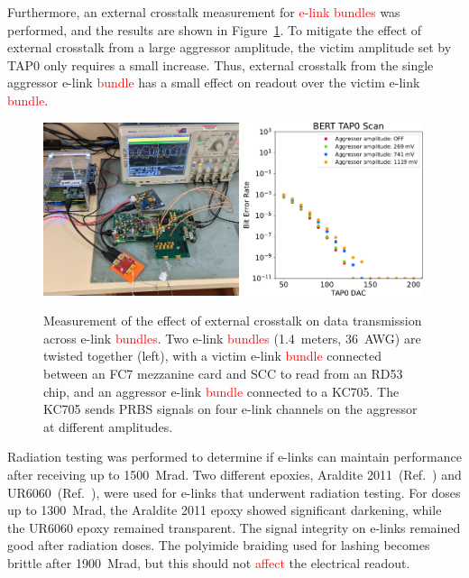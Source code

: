\documentclass[a4paper,11pt]{article}
\newcommand{\mrad}{Mrad}
\newcommand{\fig}{Figure}
\newcommand{\red}{\textcolor{red}}
\begin{document}

Furthermore, an external crosstalk measurement for \red{e-link bundles} was performed, and the results are shown in \fig~\ref{fig:external_crosstalk}.
To mitigate the effect of external crosstalk from a large aggressor amplitude, the victim amplitude set by TAP0 only requires a small increase.
Thus, external crosstalk from the single aggressor e-link \red{bundle} has a small effect on readout over the victim e-link \red{bundle}.

\begin{figure}[htbp]
\centering
\includegraphics[height=2.0in,origin=c]{../figures/external_crosstalk_setup-crop.jpg}
\hspace*{.2in}
\includegraphics[height=2.0in,origin=c]{../figures/BERT_TAP0_Scan_External_Crosstalk-crop.pdf}
\caption{
\label{fig:external_crosstalk}
Measurement of the effect of external crosstalk on data transmission across e-link \red{bundles}.
Two e-link \red{bundles} (1.4~meters, 36~AWG) are twisted together (left), with a victim e-link \red{bundle} connected between an FC7 mezzanine card and SCC to read from an RD53 chip, and an aggressor e-link \red{bundle} connected to a KC705.
The KC705 sends PRBS signals on four e-link channels on the aggressor at different amplitudes.
}
\end{figure}

Radiation testing was performed to determine if e-links can maintain performance after receiving up to 1500~\mrad.
Two different epoxies, Araldite 2011~(Ref.~\cite{ref:araldite}) and UR6060~(Ref.~\cite{ref:ur}), were used for e-links that underwent radiation testing.
For doses up to 1300~\mrad, the Araldite 2011 epoxy showed significant darkening, while the UR6060 epoxy remained transparent.
The signal integrity on e-links remained good after radiation doses.
The polyimide braiding used for lashing becomes brittle after 1900~\mrad, but this should not \red{affect} the electrical readout.
\end{document}
